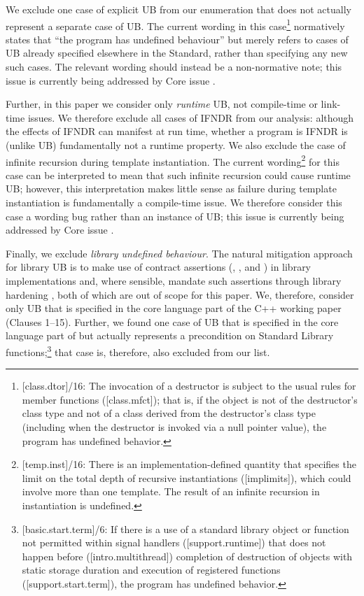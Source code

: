 We exclude one case of explicit UB from our enumeration that does not actually represent a separate case of UB. The current wording in this case\footnote{[class.dtor]/16: The invocation of a destructor is subject to the usual rules for member functions ([class.mfct]); that is, if the object is not of the destructor’s class type and not of a class derived from the destructor’s class type (including when the destructor is invoked via a null pointer value), the program has undefined behavior.} normatively states that ``the program has undefined behaviour'' but merely refers to cases of UB already specified elsewhere in the Standard, rather than specifying any new such cases. The relevant wording should instead be a non-normative note; this issue is currently being addressed by Core issue \cite{CWG3022}.

Further, in this paper we consider only \emph{runtime} UB, not compile-time or link-time issues. We therefore exclude all cases of IFNDR from our analysis: although the effects of IFNDR can manifest at run time, whether a program is IFNDR is (unlike UB) fundamentally not a runtime property.
We also exclude the case of infinite recursion during template instantiation. The current wording\footnote{[temp.inst]/16: There is an implementation-defined quantity that specifies the limit on the total depth of recursive instantiations ([implimits]), which could involve more than one template. The result of an infinite recursion in instantiation is undefined.} for this case can be interpreted to mean that such infinite recursion could cause runtime UB; however, this interpretation makes little sense as failure during template instantiation is fundamentally a compile-time issue. We therefore consider this case a wording bug rather than an instance of UB; this issue is currently being addressed by Core issue \cite{CWG3034}.

Finally, we exclude \emph{library undefined behaviour}. The natural mitigation approach for library UB is to make use of contract assertions (, , and ) in library implementations and, where sensible, mandate such assertions through library hardening \cite{P3471R4}, both of which are out of scope for this paper. We, therefore, consider only UB that is specified in the core language part of the C++ working paper (Clauses 1--15). Further, we found one case of UB that is specified in the core language part of \cite{N5008} but actually represents a precondition on Standard Library functions;\footnote{[basic.start.term]/6: If there is a use of a standard library object or function not permitted within signal handlers ([support.runtime]) that does not happen before ([intro.multithread]) completion of destruction of objects with static storage duration and execution of  registered functions ([support.start.term]), the program has undefined behavior.}
that case is, therefore, also excluded from our list.


